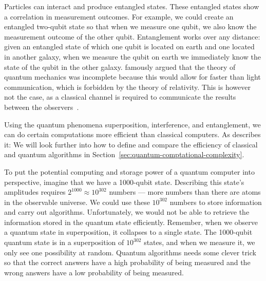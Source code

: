 \documentclass[twocolumn, switch]{article}
\begin{document}
    Particles can interact and produce entangled states.
    These entangled states show a correlation in measurement outcomes.
    For example, we could create an entangled two-qubit state so that when we measure one qubit, we also know the measurement outcome of the other qubit.
    Entanglement works over any distance: given an entangled state of which one qubit is located on earth and one located in another galaxy, when we measure the qubit on earth we immediately know the state of the qubit in the other galaxy.
    \textcite{einstein1935can} famously argued that the theory of quantum mechanics was incomplete because this would allow for faster than light communication, which is forbidden by the theory of relativity.
    This is however not the case, as a classical channel is required to communicate the results between the observers~\cite{bennett1992communication}.
    
    Using the quantum phenomena superposition, interference, and entanglement, we can do certain computations more efficient than classical computers.
    As \textcite{aaronson2011quantum} describes it: 
    We will look further into how to define and compare the efficiency of classical and quantum algorithms in Section~\ref{sec:quantum-comptational-complexity}.
    
    To put the potential computing and storage power of a quantum computer into perspective, imagine that we have a 1000-qubit state.
    Describing this state's amplitudes requires $2^{1000} \approx 10^{302}$ numbers --- more numbers than there are atoms in the observable universe.
    We could use these $10^{302}$ numbers to store information and carry out algorithms.
    Unfortunately, we would not be able to retrieve the information stored in the quantum state efficiently.
    Remember, when we observe a quantum state in superposition, it collapses to a single state.
    The 1000-qubit quantum state is in a superposition of $10^{302}$ states, and when we measure it, we only see one possibility at random.
    Quantum algorithms needs some clever trick so that the correct answers have a high probability of being measured and the wrong answers have a low probability of being measured.
    
\end{document}
